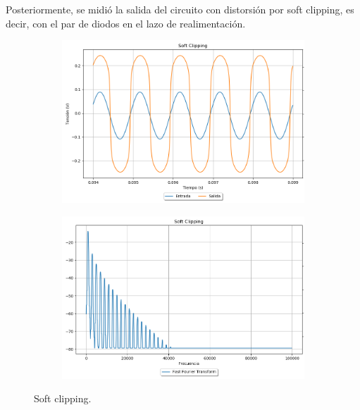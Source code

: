 Posteriormente, se midió la salida del circuito con distorsión por soft clipping, es decir, con el par de diodos en el lazo de realimentación.

\begin{figure}[H]
\hspace{-7.5em}
	\begin{subfigure}{0.5\textwidth}
		\includegraphics[width=1.5\textwidth, trim={0 0 0 0}, clip]{Ejercicio5/Imagenes/Propuesto/Mediciones/soft1.png}
		\label{fig:prop_soft1}
	\end{subfigure}
	\hspace{6em}
	\begin{subfigure}{0.5\textwidth}
		\includegraphics[width=1.5\textwidth, trim={0 0 0 0}, clip]{Ejercicio5/Imagenes/Propuesto/Mediciones/softfft1.png}
		\centering
		\label{fig:prop_soft1fft}
	\end{subfigure}
	\caption{Soft clipping.}
\end{figure}

